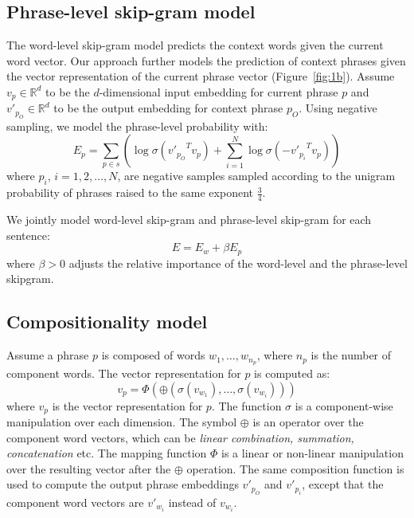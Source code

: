 \subsection{Phrase-level skip-gram model}
The word-level skip-gram model predicts the context words given the current word vector. Our approach further models the prediction of
context phrases given the vector representation of the current phrase vector (Figure~\ref{fig:1b}). Assume $v_p \in {\mathbb{R}}^d$ to be the $d$-dimensional 
input embedding for current phrase $p$ and $v'_{p_O}\in {\mathbb{R}}^d$ to be the output embedding for context phrase $p_O$. Using negative sampling, we model the phrase-level probability with:
\begin{equation}
\label{eq:phrase-skip}
    E_p = \sum_{p\in s} (\log \sigma ({v'_{p_O}}^T v_p) + \sum_{i=1}^{N} \log \sigma (-{v'_{p_i}}^T v_p))
\end{equation}
where $p_i$, $i= 1, 2, \ldots ,N$, are negative samples sampled according to the unigram probability of phrases raised to the same exponent $\frac{3}{4}$.


We jointly model word-level skip-gram and phrase-level skip-gram for each sentence:
\begin{equation}
E = E_w + \beta E_p
\end{equation}
where $\beta > 0$ adjusts the relative importance of the word-level and the phrase-level skipgram.
\subsection{Compositionality model}
Assume a phrase $p$ is composed of words $w_1, \ldots ,w_{n_p}$, where 
$n_p$ is the number of component words. The vector representation for $p$ is computed as:
\begin{equation}
    v_p = \Phi(\oplus( \sigma(v_{w_1}), \ldots ,\sigma(v_{w_i})))
\end{equation}
where $v_p$ is the vector representation for $p$. The function $\sigma$ is a component-wise manipulation over each dimension.
The symbol $\oplus$ is an operator over the component word vectors, which can be \textit{linear combination, summation, concatenation} etc. 
The mapping function $\Phi$ is a linear or non-linear manipulation over the resulting vector after the $\oplus$ operation. The same composition function is used to compute 
the output phrase embeddings $v'_{p_O}$ and $v'_{p_i}$, except that the component word vectors are $v'_{w_i}$ instead of $v_{w_i}$.


